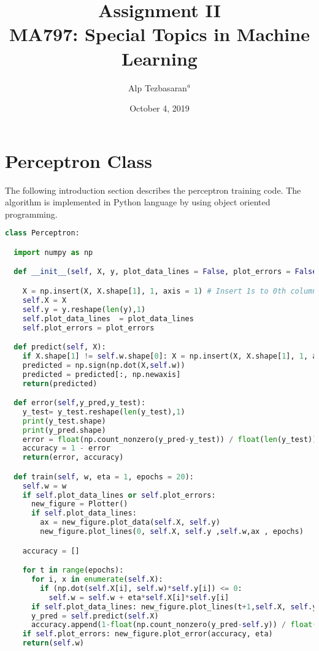\documentclass[11pt]{article}
\title{ \bf{Assignment II \\ MA797: Special Topics in Machine Learning}}
\author{Alp Tezbasaran$^{a}$}
\affil{\textit{$^{a}$Department of Nuclear Engineering NCSU, alptezbasaran@ncsu.edu}}
\date{October 4, 2019}
\begin{document}
\maketitle

\section{Perceptron Class}
The following introduction section describes the perceptron training code. The algorithm is implemented in Python language by using object oriented programming.\medskip

\begin{lstlisting}[language=Python, caption=Perceptron Class]
class Perceptron:

  import numpy as np

  def __init__(self, X, y, plot_data_lines = False, plot_errors = False):

    X = np.insert(X, X.shape[1], 1, axis = 1) # Insert 1s to 0th column
    self.X = X
    self.y = y.reshape(len(y),1)
    self.plot_data_lines  = plot_data_lines
    self.plot_errors = plot_errors

  def predict(self, X):
    if X.shape[1] != self.w.shape[0]: X = np.insert(X, X.shape[1], 1, axis = 1) # Insert 1s to 0th column
    predicted = np.sign(np.dot(X,self.w))
    predicted = predicted[:, np.newaxis]
    return(predicted)

  def error(self,y_pred,y_test):
    y_test= y_test.reshape(len(y_test),1)
    print(y_test.shape)
    print(y_pred.shape)
    error = float(np.count_nonzero(y_pred-y_test)) / float(len(y_test))
    accuracy = 1 - error
    return(error, accuracy)

  def train(self, w, eta = 1, epochs = 20):
    self.w = w
    if self.plot_data_lines or self.plot_errors:
      new_figure = Plotter()
      if self.plot_data_lines:
        ax = new_figure.plot_data(self.X, self.y)
        new_figure.plot_lines(0, self.X, self.y ,self.w,ax , epochs)

    accuracy = []

    for t in range(epochs):
      for i, x in enumerate(self.X):
        if (np.dot(self.X[i], self.w)*self.y[i]) <= 0:
          self.w = self.w + eta*self.X[i]*self.y[i]
      if self.plot_data_lines: new_figure.plot_lines(t+1,self.X, self.y, self.w,ax, epochs)
      y_pred = self.predict(self.X)
      accuracy.append(1-float(np.count_nonzero(y_pred-self.y)) / float(len(self.y)))
    if self.plot_errors: new_figure.plot_error(accuracy, eta)
    return(self.w)
\end{lstlisting}
\end{document}
